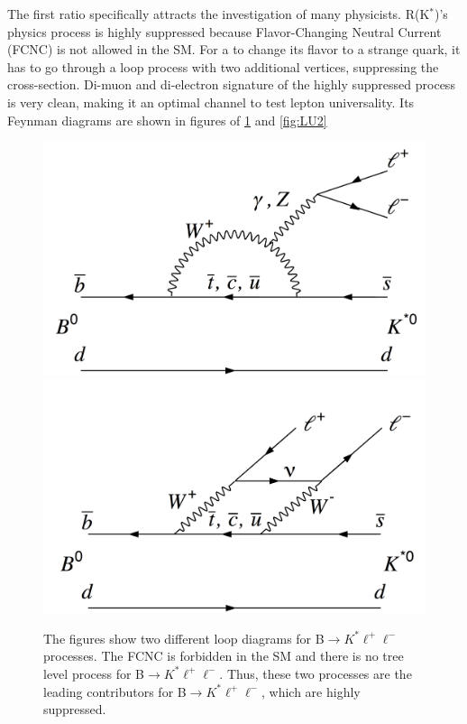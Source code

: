 The first ratio specifically attracts the investigation of many physicists.
R(K$^{*}$)'s physics process is highly suppressed because Flavor-Changing Neutral Current (FCNC) is not allowed in the SM.
For a \PQb to change its flavor to a strange quark, it has to go through a loop process with two additional vertices, suppressing the cross-section.
Di-muon and di-electron signature of the highly suppressed process is very clean, making it an optimal channel to test lepton universality.
Its Feynman diagrams are shown in figures of \ref{fig:LU1} and \ref{fig:LU2}
\begin{figure}[h!]
	\caption{The figures show two different loop diagrams for B$\to K^{*}\ell^{+}\ell^{-}$ processes. The FCNC is forbidden in the SM and there is no tree level process for B$\to K^{*}\ell^{+}\ell^{-}$. Thus, these two processes are the leading contributors for B$\to K^{*}\ell^{+}\ell^{-}$, which are highly suppressed.\cite{Lep:2017aai}}
  \label{fig:LU1}
  \centering
  \includegraphics[width=0.57\linewidth]{figs/Fig1a.png}
  \includegraphics[width=0.57\linewidth]{figs/Fig1b.png}
\end{figure}

